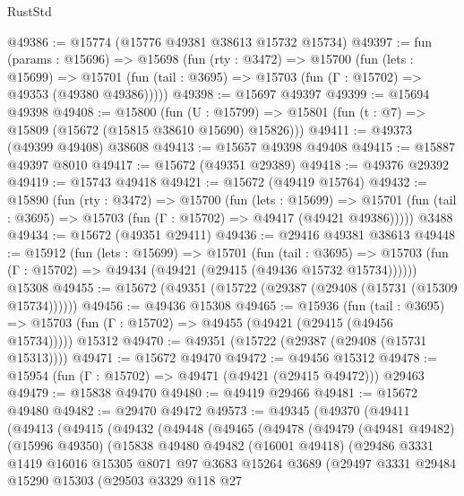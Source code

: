 \begin{lexlean}{RustStd}
\begin{coremodule}
@49386 := @15774 (@15776 @49381 @38613 @15732 @15734)
@49397 := fun (params : @15696) =>
  @15698
    (fun (rty : @3472) =>
    @15700
      (fun (lets : @15699) =>
      @15701 (fun (tail : @3695) => @15703 (fun (Γ : @15702) => @49353 (@49380 @49386)))))
@49398 := @15697 @49397
@49399 := @15694 @49398
@49408 := @15800
    (fun (U : @15799) => @15801 (fun (t : @7) => @15809 (@15672 (@15815 @38610 @15690) @15826)))
@49411 := @49373 (@49399 @49408) @38608
@49413 := @15657 @49398 @49408
@49415 := @15887 @49397 @8010
@49417 := @15672 (@49351 @29389)
@49418 := @49376 @29392
@49419 := @15743 @49418
@49421 := @15672 (@49419 @15764)
@49432 := @15890
    (fun (rty : @3472) =>
    @15700
      (fun (lets : @15699) =>
      @15701 (fun (tail : @3695) => @15703 (fun (Γ : @15702) => @49417 (@49421 @49386)))))
    @3488
@49434 := @15672 (@49351 @29411)
@49436 := @29416 @49381 @38613
@49448 := @15912
    (fun (lets : @15699) =>
    @15701
      (fun (tail : @3695) =>
      @15703 (fun (Γ : @15702) => @49434 (@49421 (@29415 (@49436 @15732 @15734))))))
    @15308
@49455 := @15672 (@49351 (@15722 (@29387 (@29408 (@15731 (@15309 @15734))))))
@49456 := @49436 @15308
@49465 := @15936
    (fun (tail : @3695) => @15703 (fun (Γ : @15702) => @49455 (@49421 (@29415 (@49456 @15734)))))
    @15312
@49470 := @49351 (@15722 (@29387 (@29408 (@15731 @15313))))
@49471 := @15672 @49470
@49472 := @49456 @15312
@49478 := @15954 (fun (Γ : @15702) => @49471 (@49421 (@29415 @49472))) @29463
@49479 := @15838 @49470
@49480 := @49419 @29466
@49481 := @15672 @49480
@49482 := @29470 @49472
@49573 := @49345
    (@49370
      (@49411
        (@49413
          (@49415
            (@49432
              (@49448
                (@49465
                  (@49478
                    (@49479
                      (@49481 @49482)
                      (@15996 @49350)
                      (@15838
                        @49480
                        @49482
                        (@16001 @49418)
                        (@29486
                          @3331
                          @1419
                          @16016
                          @15305
                          @8071
                          @97
                          @3683
                          @15264
                          @3689
                          (@29497
                            @3331
                            @29484
                            @15290
                            @15303
                            (@29503
                              @3329
                              @118
                              @27

\end{coremodule}
\end{lexlean}

